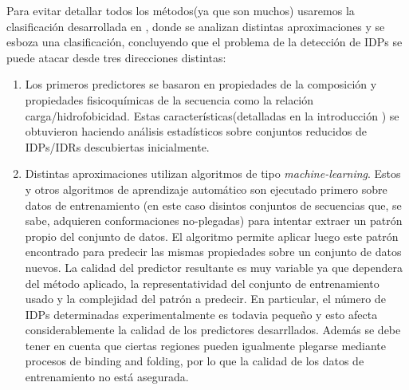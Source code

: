 Para evitar detallar todos los métodos(ya que son muchos) usaremos la clasificación desarrollada en \cite{habchi2014introducing}, donde se analizan distintas 
aproximaciones y se esboza una clasificación, concluyendo que el problema de la detección de IDPs  se puede atacar desde tres direcciones distintas:
\begin{enumerate}

\item Los primeros predictores se basaron en propiedades de la composición y propiedades fisicoquímicas de la secuencia como la relación carga/hidrofobicidad. 
Estas características(detalladas en la introducción ) se obtuvieron haciendo análisis estadísticos sobre conjuntos reducidos de IDPs/IDRs descubiertas inicialmente.

\item Distintas aproximaciones utilizan algoritmos de tipo \textit{machine-learning}. Estos y otros algoritmos de aprendizaje automático son ejecutado primero sobre datos de entrenamiento 
(en este caso disintos conjuntos de secuencias que, se sabe, adquieren conformaciones no-plegadas) para intentar extraer un patrón propio del conjunto de datos.
El algoritmo permite aplicar luego este patrón encontrado para predecir las mismas propiedades sobre un conjunto de datos nuevos. 
La calidad del predictor resultante es muy variable ya que dependera del método aplicado, la representatividad del conjunto de entrenamiento usado y la complejidad del patrón a predecir.
En particular, el número de IDPs determinadas experimentalmente es todavia pequeño y esto afecta considerablemente la calidad de los predictores desarrllados.
Además se debe tener en cuenta que ciertas regiones pueden igualmente plegarse mediante procesos de binding and folding, por lo que la calidad de los datos de entrenamiento no está asegurada.



\end{enumerate}
